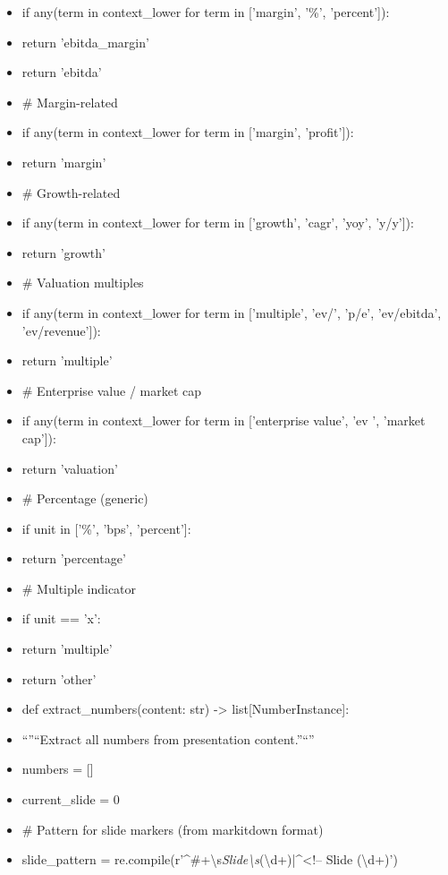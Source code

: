 \documentclass[11pt]{article}
\begin{document}
\begin{itemize}[leftmargin=*,itemsep=2pt,topsep=2pt]
\item {} if any(term in context\_\allowbreak{}lower for term in ['margin', '\%', 'percent']):
\item {} return 'ebitda\_\allowbreak{}margin'
\item {} return 'ebitda'
\item {} \# Margin-related
\item {} if any(term in context\_\allowbreak{}lower for term in ['margin', 'profit']):
\item {} return 'margin'
\item {} \# Growth-related
\item {} if any(term in context\_\allowbreak{}lower for term in ['growth', 'cagr', 'yoy', 'y/y']):
\item {} return 'growth'
\item {} \# Valuation multiples
\item {} if any(term in context\_\allowbreak{}lower for term in ['multiple', 'ev/', 'p/e', 'ev/ebitda', 'ev/revenue']):
\item {} return 'multiple'
\item {} \# Enterprise value / market cap
\item {} if any(term in context\_\allowbreak{}lower for term in ['enterprise value', 'ev ', 'market cap']):
\item {} return 'valuation'
\item {} \# Percentage (generic)
\item {} if unit in ['\%', 'bps', 'percent']:
\item {} return 'percentage'
\item {} \# Multiple indicator
\item {} if unit == 'x':
\item {} return 'multiple'
\item {} return 'other'
\item {} def extract\_\allowbreak{}numbers(content: str) -> list[NumberInstance]:
\item {} ``''``Extract all numbers from presentation content.''``''
\item {} numbers = []
\item {} current\_\allowbreak{}slide = 0
\item {} \# Pattern for slide markers (from markitdown format)
\item {} slide\_\allowbreak{}pattern = re.compile(r'\textasciicircum{}\#+\textbackslash{}s\emph{Slide\textbackslash{}s}(\textbackslash{}d+)|\textasciicircum{}<!-- Slide (\textbackslash{}d+)')

\end{itemize}
\end{document}
